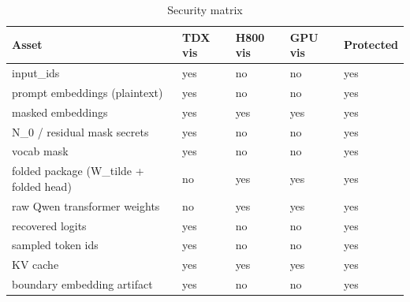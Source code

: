 \begin{table}[h]
\centering
\caption{Security matrix}
\begin{tabular}{lllll}
\hline
Asset & TDX vis & H800 vis & GPU vis & Protected \\
\hline
input\_ids & yes & no & no & yes \\
prompt embeddings (plaintext) & yes & no & no & yes \\
masked embeddings & yes & yes & yes & yes \\
N\_0 / residual mask secrets & yes & no & no & yes \\
vocab mask & yes & no & no & yes \\
folded package (W\_tilde + folded head) & no & yes & yes & yes \\
raw Qwen transformer weights & no & yes & yes & yes \\
recovered logits & yes & no & no & yes \\
sampled token ids & yes & no & no & yes \\
KV cache & yes & yes & yes & yes \\
boundary embedding artifact & yes & no & no & yes \\
\hline
\end{tabular}
\end{table}

